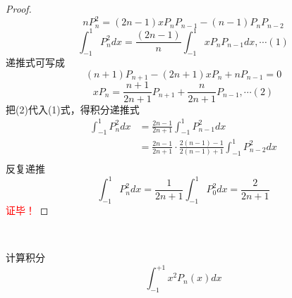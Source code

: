 \begin{proof}
		\begin{equation*}
			nP ^2 _{n} =(2n-1)x P_n P_{n-1} - (n-1)P_nP_{n-2} 
		\end{equation*}		
		\begin{equation*}
			\int_{-1}^{1}  P ^2 _{n} dx = \frac{(2n-1)}{n} \int_{-1}^{1}  x P_n P_{n-1} dx , \cdots (1)
		\end{equation*}	
		递推式可写成
		\begin{equation*}
			(n+1)P_{n+1} -(2n+1)x P_{n} + nP_{n-1}  =0  
		\end{equation*}		
		\begin{equation*}	
			x P_{n}=\frac{n+1}{2n+1}P_{n+1} + \frac{n}{2n+1}P_{n-1} , \cdots (2)
		\end{equation*}	
		把(2)代入(1)式，得积分递推式
		\begin{align*}
			\int_{-1}^{1}  P ^2 _{n} dx &=  \frac{2n-1}{2n+1}\int_{-1}^{1}   P^2_{n-1} dx \\
			&=  \frac{2n-1}{2n+1} \cdot \frac{2(n-1)-1}{2(n-1)+1} \int_{-1}^{1}   P^2_{n-2} dx \\
		\end{align*}		
		反复递推
		\begin{equation*}
			\int_{-1}^{1}  P ^2 _{n} dx =  \frac{1}{2n+1}\int_{-1}^{1}   P^2_{0} dx = \frac{2}{2n+1}
		\end{equation*}	
	\textcolor{red}{证毕！}
	\end{proof}
	~~\\ 
	
	\begin{example}
	计算积分
		\begin{equation*}
			\int_{-1}^{+1} x^2 P _{n}(x) dx 
		\end{equation*}	
	\end{example}
	 
